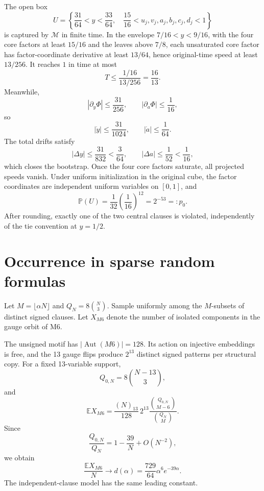 \documentclass[11pt,a4paper]{article}
\newcommand{\Mmot}{\mathcal M}
\begin{document}
The open box
\begin{equation}
U=\left\{\frac{31}{64}<y<\frac{33}{64},\quad \frac{15}{16}<u_j,v_j,a_j,b_j,c_j,d_j<1\right\}
\end{equation}
is captured by $\Mmot$ in finite time. In the envelope $7/16<y<9/16$, with the four core factors at least $15/16$ and the leaves above $7/8$, each unsaturated core factor has factor-coordinate derivative at least $13/64$, hence original-time speed at least $13/256$. It reaches $1$ in time at most
\[
T\le \frac{1/16}{13/256}=\frac{16}{13}.
\]
Meanwhile,
\[
|\partial_y\Phi|\le\frac{31}{256},\qquad |\partial_a\Phi|\le\frac1{16},
\]
so
\[
|\dot y|\le\frac{31}{1024},\qquad |\dot a|\le\frac1{64}.
\]
The total drifts satisfy
\[
|\Delta y|\le\frac{31}{832}<\frac3{64},\qquad |\Delta a|\le\frac1{52}<\frac1{16},
\]
which closes the bootstrap. Once the four core factors saturate, all projected speeds vanish. Under uniform initialization in the original cube, the factor coordinates are independent uniform variables on $[0,1]$, and
\begin{equation}
\mathbb P(U)=\frac1{32}\left(\frac1{16}\right)^{12}=2^{-53}=:p_0.
\end{equation}
After rounding, exactly one of the two central clauses is violated, independently of the tie convention at $y=1/2$.

\section{Occurrence in sparse random formulas}
Let $M=\lfloor\alpha N\rfloor$ and $Q_N=8\binom N3$. Sample uniformly among the $M$-subsets of distinct signed clauses. Let $X_{M6}$ denote the number of isolated components in the gauge orbit of M6.

The unsigned motif has $|\operatorname{Aut}(M6)|=128$. Its action on injective embeddings is free, and the 13 gauge flips produce $2^{13}$ distinct signed patterns per structural copy. For a fixed 13-variable support,
\[
Q_{0,N}=8\binom{N-13}{3},
\]
and
\begin{equation}
\mathbb E X_{M6}=\frac{(N)_{13}}{128}\,2^{13}\frac{\binom{Q_{0,N}}{M-6}}{\binom{Q_N}{M}}.
\end{equation}
Since
\[
\frac{Q_{0,N}}{Q_N}=1-\frac{39}{N}+O(N^{-2}),
\]
we obtain
\begin{equation}
\frac{\mathbb E X_{M6}}{N}\longrightarrow d(\alpha)=\frac{729}{64}\alpha^6e^{-39\alpha}.
\end{equation}
The independent-clause model has the same leading constant.
\end{document}
